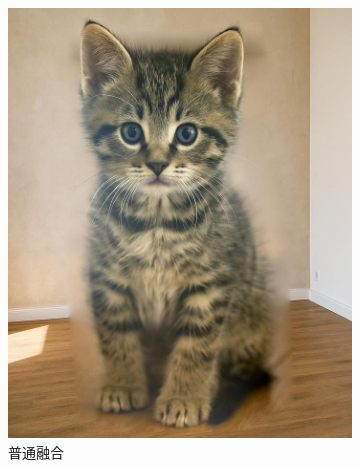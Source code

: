 \documentclass[11pt,a4paper]{article}
\begin{document}
		\begin{figure}[ht]
			\centering
			\begin{subfigure}[htbp]{0.45\textwidth}
				\includegraphics[width=\textwidth]{../../result/result_30.jpg}
				\caption{普通融合}
			\end{subfigure}
			\begin{subfigure}[htbp]{0.45\textwidth}

\end{subfigure}
\end{figure}
\end{document}
